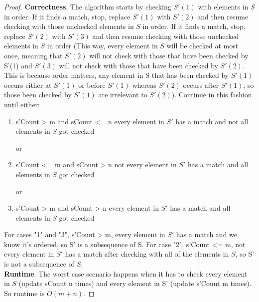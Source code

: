 \documentclass[paper=a4, fontsize=11pt]{scrartcl} %
\numberwithin{equation}{section} %
\numberwithin{figure}{section} %
\numberwithin{table}{section} %
\begin{document}
\begin{proof}

\textbf{Correctness}. 
The algorithm starts by checking $S'(1)$ with elements in $S$ in order. If it finds a match, stop,
replace $S'(1)$ with $S'(2)$ and then resume checking with those unchecked elements in $S$ in order. 
If it finds a match, stop, replace $S'(2)$ with $S'(3)$ and then resume checking with those unchecked
elements in $S$ in order (This way, every element in $S$ will be checked at most once, meaning that $S'(2)$ 
will not check with those that have been checked by S'(1) and $S'(3)$ will not check with those that have been
checked by $S'(2)$. This is because order matters, any element in S that has been checked by $S'(1)$ occurs either at $S'(1)$ or before $S'(1)$ 
whereas $S'(2)$ occurs after $S'(1)$, so those been checked by $S'(1)$ are irrelevant to $S'(2)$). 
  Continue in this fashion until either:   
\begin{enumerate}
\item s'Count > m and sCount <= n
every element in $S'$ has a match and not all elements in $S$ got checked 

or\item s'Count <= m and sCount > n
not every element in $S'$ has a match and all elements in $S$ got checked 

or \item s'Count > m and sCount > n
every element in $S'$ has a match and all elements in $S$ got checked
\end{enumerate}

For cases "1" and "3", s'Count > m, every element in $S'$ has a match and we know it's ordered, so S' is a 
subsequence of S.
For case "2", s'Count <= m, not every element in $S'$ has a match after checking with all of the elements in $S$,
so S' is not a subsequence of $S$.
\\
\textbf{Runtime}.
The worst case scenario happens when it has to check every element in $S$ (update sCount n times) and
every element in S' (update s'Count m times). So runtime is $O(m+n)$. 
\end{proof}

\end{document}
